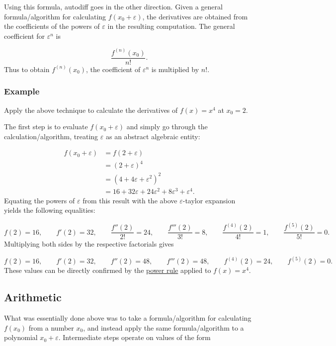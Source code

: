 \documentclass{article}
\begin{document}
Using this formula, autodiff goes in the other direction. Given a general formula/algorithm for calculating
$f(x_0+\varepsilon)$, the derivatives are obtained from the coefficients of the powers of $\varepsilon$
in the resulting computation. The general coefficient for $\varepsilon^n$ is

\[\frac{f^{(n)}(x_0)}{n!}.\]
Thus to obtain $f^{(n)}(x_0)$, the coefficient of $\varepsilon^n$ is multiplied by $n!$.

\subsubsection{Example}

Apply the above technique to calculate the derivatives of $f(x)=x^4$ at $x_0=2$.

The first step is to evaluate $f(x_0+\varepsilon)$ and simply go through the calculation/algorithm, treating
$\varepsilon$ as an abstract algebraic entity:

\begin{align*}
f(x_0+\varepsilon) &= f(2+\varepsilon) \\
 &= (2+\varepsilon)^4 \\
 &= \left(4+4\varepsilon+\varepsilon^2\right)^2 \\
 &= 16+32\varepsilon+24\varepsilon^2+8\varepsilon^3+\varepsilon^4.
\end{align*}
Equating the powers of $\varepsilon$ from this result with the above $\varepsilon$-taylor expansion
yields the following equalities:

\[
f(2) = 16, \qquad
f'(2) = 32, \qquad
\frac{f''(2)}{2!} = 24, \qquad
\frac{f'''(2)}{3!} = 8, \qquad
\frac{f^{(4)}(2)}{4!} = 1, \qquad
\frac{f^{(5)}(2)}{5!} = 0.
\]
Multiplying both sides by the respective factorials gives

\[
f(2) = 16, \qquad
f'(2) = 32, \qquad
f''(2) = 48, \qquad
f'''(2) = 48, \qquad
f^{(4)}(2) = 24, \qquad
f^{(5)}(2) = 0.
\]
These values can be directly confirmed by the \href{https://en.wikipedia.org/wiki/Power_rule}{power rule}
applied to $f(x)=x^4$.

\subsection{Arithmetic}

What was essentially done above was to take a formula/algorithm for calculating $f(x_0)$ from a number $x_0$,
and instead apply the same formula/algorithm to a polynomial $x_0+\varepsilon$. Intermediate steps operate on
values of the form
\end{document}
